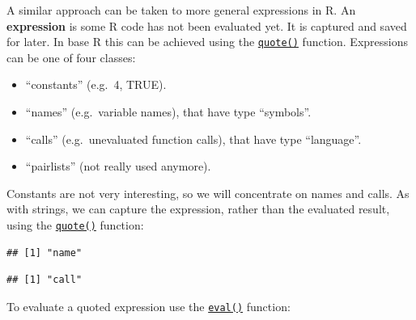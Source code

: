 \documentclass[]{book}
\newenvironment{Shaded}{\begin{snugshade}}{\end{snugshade}}
\newcommand{\DecValTok}[1]{\textcolor[rgb]{0.00,0.00,0.81}{#1}}
\newcommand{\KeywordTok}[1]{\textcolor[rgb]{0.13,0.29,0.53}{\textbf{#1}}}
\newcommand{\NormalTok}[1]{#1}
\newcommand{\OperatorTok}[1]{\textcolor[rgb]{0.81,0.36,0.00}{\textbf{#1}}}
\newcommand{\StringTok}[1]{\textcolor[rgb]{0.31,0.60,0.02}{#1}}
\providecommand{\tightlist}{%
  \setlength{\itemsep}{0pt}\setlength{\parskip}{0pt}}
\begin{document}
A similar approach can be taken to more general expressions in R. An \textbf{expression} is some
R code has not been evaluated yet. It is captured and saved for later. In base R this can
be achieved using the
\href{https://www.rdocumentation.org/packages/base/topics/substitute}{\texttt{quote()}} function.
Expressions can be one of four classes:

\begin{itemize}
\tightlist
\item
  ``constants'' (e.g.~4, TRUE).
\item
  ``names'' (e.g.~variable names), that have type ``symbols''.
\item
  ``calls'' (e.g.~unevaluated function calls), that have type ``language''.
\item
  ``pairlists'' (not really used anymore).
\end{itemize}

Constants are not very interesting, so we will concentrate on names and calls. As with
strings, we can capture the expression, rather than the evaluated result, using the
\href{https://www.rdocumentation.org/packages/base/topics/substitute}{\texttt{quote()}} function:

\begin{Shaded}
\end{Shaded}

\begin{verbatim}
## [1] "name"
\end{verbatim}

\begin{Shaded}
\end{Shaded}

\begin{verbatim}
## [1] "call"
\end{verbatim}

To evaluate a quoted expression use the
\href{https://www.rdocumentation.org/packages/base/topics/eval}{\texttt{eval()}} function:

\begin{Shaded}
\end{Shaded}
\end{document}
